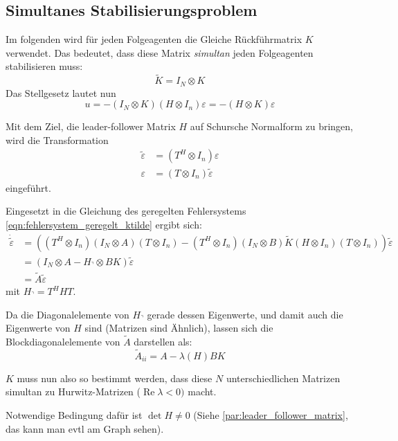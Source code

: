 \subsection{Simultanes Stabilisierungsproblem}
Im folgenden wird für jeden Folgeagenten die Gleiche Rückführmatrix $K$ verwendet.
Das bedeutet, dass diese Matrix \emph{simultan} jeden Folgeagenten stabilisieren
muss:
\begin{equation}
    \tilde{K}=I_N \otimes K
\end{equation}
Das Stellgesetz lautet nun
\begin{equation}
    u=-(I_N \otimes K) (H \otimes I_n)\varepsilon = -(H \otimes K)\varepsilon
\end{equation}

Mit dem Ziel, die leader-follower Matrix $H$ auf Schursche Normalform zu bringen,
wird die Transformation
\begin{align}
    \tilde{\varepsilon} &= (T^H \otimes I_n)\varepsilon \\
    \varepsilon &= (T \otimes I_n)\tilde{\varepsilon}
\end{align}
eingeführt.

Eingesetzt in die Gleichung des geregelten Fehlersystems \ref{eqn:fehlersystem_geregelt_ktilde}
ergibt sich:
\begin{align}
    \dot{\tilde{\varepsilon}} &=((T^H \otimes I_n)(I_N \otimes A)(T \otimes I_n) - (T^H \otimes I_n)(I_N \otimes B)\tilde{K}(H \otimes I_n)(T \otimes I_n)) \tilde{\varepsilon} \\
    &= (I_N \otimes A - H_\urcorner \otimes BK)\tilde{\varepsilon} \\
    &= \tilde{A}\tilde{\varepsilon} 
\end{align}
mit $H_\urcorner = T^H H T$.

Da die Diagonalelemente von $H_\urcorner$ gerade dessen Eigenwerte, und damit auch die
Eigenwerte von $H$ sind (Matrizen sind Ähnlich), lassen sich die Blockdiagonalelemente von
$\tilde{A}$ darstellen als:
\begin{equation}
    \tilde{A}_{ii} = A-\lambda(H)BK
\end{equation}

$K$ muss nun also so bestimmt werden, dass diese $N$ unterschiedlichen Matrizen simultan
zu Hurwitz-Matrizen ($\operatorname{Re}\lambda < 0)$ macht.

Notwendige Bedingung dafür ist $\det H \neq 0$ (Siehe \ref{par:leader_follower_matrix}, das
kann man evtl am Graph sehen).


